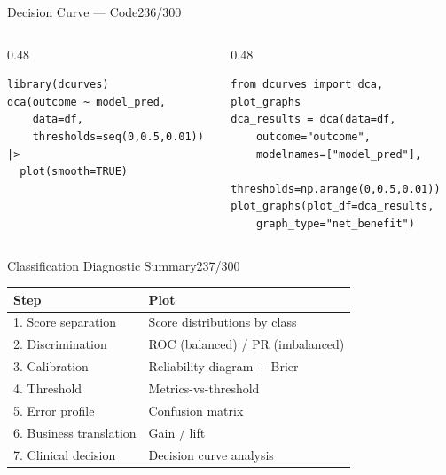 \documentclass[10pt]{beamer}
\newcommand{\smark}[1]{\hfill{\scriptsize\color{codegray}#1}}
\begin{document}
\begin{frame}[fragile]{Decision Curve --- Code}\smark{236/300}
\begin{columns}[T]
\begin{column}{0.48\textwidth}
\begin{lstlisting}[style=Rstyle]
library(dcurves)
dca(outcome ~ model_pred,
    data=df,
    thresholds=seq(0,0.5,0.01)) |>
  plot(smooth=TRUE)
\end{lstlisting}
\end{column}
\begin{column}{0.48\textwidth}
\begin{lstlisting}[style=Pystyle]
from dcurves import dca, plot_graphs
dca_results = dca(data=df,
    outcome="outcome",
    modelnames=["model_pred"],
    thresholds=np.arange(0,0.5,0.01))
plot_graphs(plot_df=dca_results,
    graph_type="net_benefit")
\end{lstlisting}
\end{column}
\end{columns}
\end{frame}

\begin{frame}{Classification Diagnostic Summary}\smark{237/300}
\centering\small
\begin{tabular}{@{}ll@{}}
    \toprule
    \textbf{Step} & \textbf{Plot} \\
    \midrule
    1. Score separation      & Score distributions by class \\
    2. Discrimination        & ROC (balanced) / PR (imbalanced) \\
    3. Calibration           & Reliability diagram + Brier \\
    4. Threshold             & Metrics-vs-threshold \\
    5. Error profile         & Confusion matrix \\
    6. Business translation  & Gain / lift \\
    7. Clinical decision     & Decision curve analysis \\
    \bottomrule
\end{tabular}
\end{frame}
\end{document}
